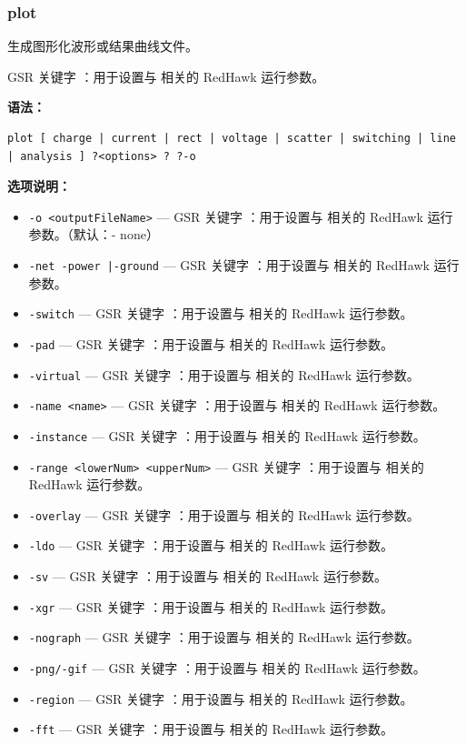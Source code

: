 \subsubsection*{plot}

生成图形化波形或结果曲线文件。

GSR 关键字 ：用于设置与  相关的 RedHawk 运行参数。

\textbf{语法：}
\begin{lstlisting}
plot [ charge | current | rect | voltage | scatter | switching | line | analysis ] ?<options> ? ?-o
\end{lstlisting}

\textbf{选项说明：}
\begin{itemize}
\item \texttt{-o <outputFileName>} — GSR 关键字 ：用于设置与  相关的 RedHawk 运行参数。（默认：- none）
\item \texttt{-net -power |-ground} — GSR 关键字 ：用于设置与  相关的 RedHawk 运行参数。
\item \texttt{-switch} — GSR 关键字 ：用于设置与  相关的 RedHawk 运行参数。
\item \texttt{-pad} — GSR 关键字 ：用于设置与  相关的 RedHawk 运行参数。
\item \texttt{-virtual} — GSR 关键字 ：用于设置与  相关的 RedHawk 运行参数。
\item \texttt{-name <name>} — GSR 关键字 ：用于设置与  相关的 RedHawk 运行参数。
\item \texttt{-instance} — GSR 关键字 ：用于设置与  相关的 RedHawk 运行参数。
\item \texttt{-range <lowerNum> <upperNum>} — GSR 关键字 ：用于设置与  相关的 RedHawk 运行参数。
\item \texttt{-overlay} — GSR 关键字 ：用于设置与  相关的 RedHawk 运行参数。
\item \texttt{-ldo} — GSR 关键字 ：用于设置与  相关的 RedHawk 运行参数。
\item \texttt{-sv} — GSR 关键字 ：用于设置与  相关的 RedHawk 运行参数。
\item \texttt{-xgr} — GSR 关键字 ：用于设置与  相关的 RedHawk 运行参数。
\item \texttt{-nograph} — GSR 关键字 ：用于设置与  相关的 RedHawk 运行参数。
\item \texttt{-png/-gif} — GSR 关键字 ：用于设置与  相关的 RedHawk 运行参数。
\item \texttt{-region} — GSR 关键字 ：用于设置与  相关的 RedHawk 运行参数。
\item \texttt{-fft} — GSR 关键字 ：用于设置与  相关的 RedHawk 运行参数。

\end{itemize}
